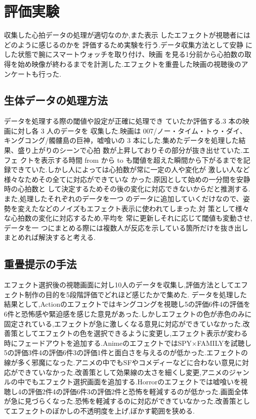 \thispagestyle{myheadings}
\chapter{評価実験}

収集した心拍データの処理が適切なのか,また表示 したエフェクトが視聴者にはどのように感じるのかを 評価するため実験を行う.データ収集方法として安静 にした状態で腕にスマートウォッチを取り付け、映画 を見る1分前から心拍数の取得を始め映像が終わるまでを計測した.エフェクトを重畳した映画の視聴後のアンケートも行った. 

\section{生体データの処理方法}
データを処理する際の閾値や設定が正確に処理でき ていたか評価する.3 本の映画に対し各 3 人のデータを 収集した.映画は 007/ノー・タイム・トゥ・ダイ、キングコング/髑髏島の巨神，嘘喰いの 3 本にした.集めたデータを処理した結果、盛り上がりのシーンで心拍 数が上昇しておりその部分が抜き出せていた.エフェ クトを表示する時間 from から to も閾値を超えた瞬間から下がるまでを記録できていた.しかし人によっては心拍数が常に一定の人や変化が 激しい人など様々なためその全てに対応ができていな かった.原因として始めの一分間を安静時の心拍数と して決定するためその後の変化に対応できないからだと推測する.また,処理したそれぞれのデータを一つ のデータに追加していくだけなので、姿勢を変えたなどのノイズもエフェクト表示に使われてしまった.対 策として様々な心拍数の変化に対応するため,平均を 常に更新しそれに応じて閾値も変動させ,データを一 つにまとめる際には複数人が反応を示している箇所だけを抜き出しまとめれば解決すると考える. 

\section{重畳提示の手法}
エフェクト選択後の視聴画面に対し10人のデータを収集し,評価方法としてエフェクト制作の目的を5段階評価でどれほど感じたかで集めた.
データを処理した結果として,Actionのエフェクトではキングコングを視聴し5の評価6件4の評価を6件と恐怖感や緊迫感を感じた意見があった.しかしエフェクトの色が赤色のみに固定されている,エフェクトが急に激しくなる意見に対応ができていなかった.改善策としてエフェクトの色を選択できるように変更し,エフェクト表示が変わる時にフェードアウトを追加する.AnimeのエフェクトではSPY×FAMILYを試聴し5の評価3件4の評価6件3の評価1件と面白さを与えるのが低かった.エフェクトの線が多く邪魔になった.アニメの中でもSFやコメディーなどに合わない意見に対応ができていなかった.改善策として効果線の太さを細くし変更,アニメのジャンルの中でもエフェクト選択画面を追加する.Horrorのエフェクトでは嘘喰いを視聴し4の評価2件4の評価6件3の評価2件と恐怖を軽減するのが低かった.画面全体が急に見づらくなった.恐怖を軽減するのに対応ができていなかった.改善策としてエフェクトのぼかしの不透明度を上げ,ぼかす範囲を狭める.

